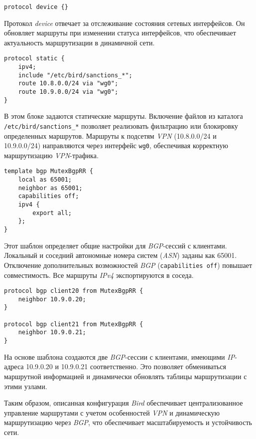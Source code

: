 \begin{lstlisting}
protocol device {}
\end{lstlisting}

Протокол \textit{device} отвечает за отслеживание состояния сетевых интерфейсов. Он обновляет маршруты при изменении статуса интерфейсов, что обеспечивает актуальность маршрутизации в динамичной сети.

\begin{lstlisting}
protocol static {
    ipv4;
    include "/etc/bird/sanctions_*";
    route 10.8.0.0/24 via "wg0";
    route 10.9.0.0/24 via "wg0";
}
\end{lstlisting}

В этом блоке задаются статические маршруты. Включение файлов из каталога \lstinline|/etc/bird/sanctions_*| позволяет реализовать фильтрацию или блокировку определенных маршрутов. Маршруты к подсетям \textit{VPN} (10.8.0.0/24 и 10.9.0.0/24) направляются через интерфейс \lstinline{wg0}, обеспечивая корректную маршрутизацию \textit{VPN}-трафика.

\begin{lstlisting}
template bgp MutexBgpRR {
    local as 65001;
    neighbor as 65001;
    capabilities off;
    ipv4 {
        export all;
    };
}
\end{lstlisting}

Этот шаблон определяет общие настройки для \textit{BGP}-сессий с клиентами. Локальный и соседний автономные номера систем (\textit{ASN}) заданы как 65001. Отключение дополнительных возможностей \textit{BGP} (\lstinline{capabilities off}) повышает совместимость. Все маршруты \textit{IPv4} экспортируются в соседа.

\begin{lstlisting}
protocol bgp client20 from MutexBgpRR {
    neighbor 10.9.0.20;
}

protocol bgp client21 from MutexBgpRR {
    neighbor 10.9.0.21;
}
\end{lstlisting}

На основе шаблона создаются две \textit{BGP}-сессии с клиентами, имеющими \textit{IP}-адреса 10.9.0.20 и 10.9.0.21 соответственно. Это позволяет обмениваться маршрутной информацией и динамически обновлять таблицы маршрутизации с этими узлами.

Таким образом, описанная конфигурация \textit{Bird} обеспечивает централизованное управление маршрутами с учетом особенностей \textit{VPN} и динамическую маршрутизацию через \textit{BGP}, что обеспечивает масштабируемость и устойчивость сети.
